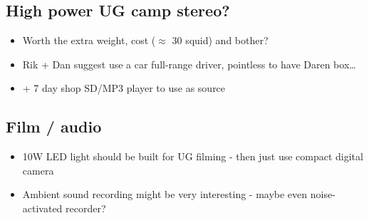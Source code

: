     \subsection{High power UG camp stereo?}
        \begin{itemize}
            \item Worth the extra weight, cost ($\approx$ 30 squid) and bother?
            \item Rik + Dan suggest use a car full-range driver, pointless to have Daren box\ldots{}
            \item + 7 day shop SD/MP3 player to use as source
        \end{itemize}
        
    \subsection{Film / audio}
        \begin{itemize}
            \item 10W LED light should be built for UG filming - then just use compact digital camera
            \item Ambient sound recording might be very interesting - maybe even noise-activated recorder?
        \end{itemize}   
        
